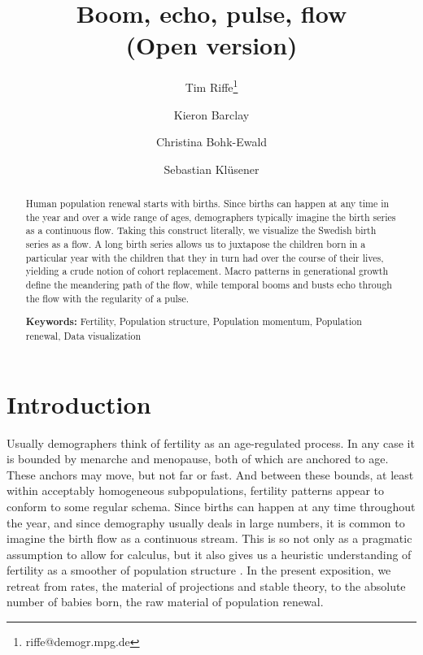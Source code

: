 \documentclass{article}
\begin{document}
\doublespacing
\title{Boom, echo, pulse, flow\\ \small (Open version)}
\author[1]{Tim Riffe\thanks{riffe@demogr.mpg.de}}
\author[1]{Kieron Barclay}
\author[1]{Christina Bohk-Ewald}
\author[2]{Sebastian Kl\"usener}
\maketitle

\pagebreak
\begin{abstract}
Human population renewal starts with births. Since births can happen at any
time in the year and over a wide range of ages, demographers typically imagine
the birth series as a continuous flow. Taking this construct literally, we
visualize the Swedish birth series as a flow. A long birth series allows us to
juxtapose the children born in a particular year with the children that
they in turn had over the course of their lives, yielding a crude notion of
cohort replacement. Macro patterns in generational growth define the meandering
path of the flow, while temporal booms and busts echo through the flow with the
regularity of a pulse.
\vspace{1em}

{\bf Keywords:} Fertility, Population structure, Population momentum, Population renewal, Data visualization
\end{abstract}


\section{Introduction}
Usually demographers think of fertility as an age-regulated process. In any case it is
bounded by menarche and menopause, both of which are anchored to age. These anchors may
move, but not far or fast. And between these bounds, at least within acceptably homogeneous subpopulations, fertility patterns appear to conform to some regular schema. Since births can happen at any time throughout the year, and since demography usually deals in large numbers, it is common to imagine the birth flow as a continuous stream. This is so not only as a pragmatic assumption to allow for calculus, but it also gives us a heuristic understanding of fertility as a smoother of population structure \citep{arthur1982ergodic}. In the present exposition, we retreat from rates, the material of projections and stable theory, to the absolute number of babies born, the raw material of population renewal. 
\end{document}
